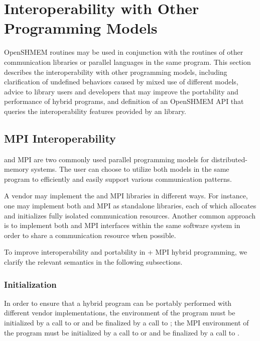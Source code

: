 \chapter{Interoperability with Other Programming Models}\label{sec:interoperability}

OpenSHMEM routines may be used in conjunction with the routines of other
communication libraries or parallel languages in the same program. This section
describes the interoperability with other programming models, including
clarification of undefined behaviors caused by mixed use of different models,
advice to \openshmem library users and developers that may improve the portability
and performance of hybrid programs, and definition of an OpenSHMEM
API that queries the interoperability features provided by an \openshmem library.


\section{MPI Interoperability}

\openshmem and MPI are two commonly used parallel programming models for
distributed-memory systems. The user can choose to utilize both models in the same program
to efficiently and easily support various communication patterns.

A vendor may implement the \openshmem and MPI libraries in different ways. For
instance, one may implement both \openshmem and MPI as standalone libraries,
each of which allocates and initializes fully isolated communication
resources.
Another common approach
is to implement both \openshmem and MPI interfaces within the
same software system in order to share a communication resource when possible.

To improve interoperability and portability in \openshmem + MPI hybrid
programming, we clarify the relevant semantics in the following subsections.


\subsection{Initialization}
In order to ensure that a hybrid program can be portably performed with different vendor
implementations, the \openshmem environment of the program must be initialized by
a call to  or  and be finalized by
a call to ; the MPI environment of the program must be initialized
by a call to  or  and be finalized by a
call to .

